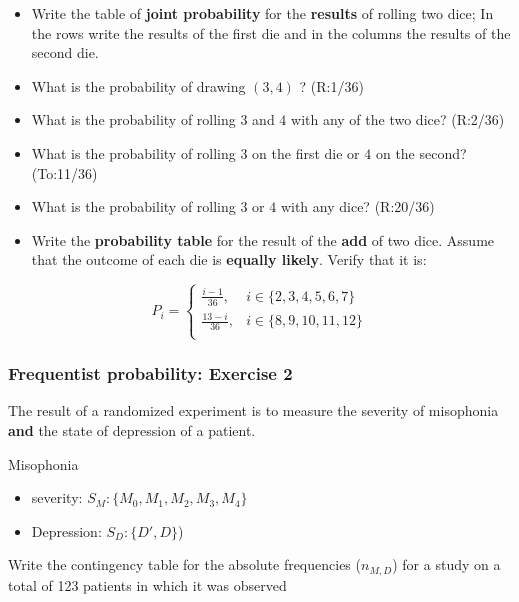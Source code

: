 \documentclass[
]{book}
\providecommand{\tightlist}{%
  \setlength{\itemsep}{0pt}\setlength{\parskip}{0pt}}
\begin{document}
\begin{itemize}
\item
  Write the table of \textbf{joint probability} for the \textbf{results} of rolling two dice; In the rows write the results of the first die and in the columns the results of the second die.
\item
  What is the probability of drawing \((3, 4)\) ? (R:1/36)
\item
  What is the probability of rolling \(3\) and \(4\) with any of the two dice? (R:2/36)
\item
  What is the probability of rolling \(3\) on the first die or \(4\) on the second? (To:11/36)
\item
  What is the probability of rolling \(3\) or \(4\) with any dice? (R:20/36)
\item
  Write the \textbf{probability table} for the result of the \textbf{add} of two dice. Assume that the outcome of each die is \textbf{equally likely}. Verify that it is:
\end{itemize}

\[
P_i=
\begin{cases}
\frac{i-1}{36},& i \in \{2,3,4,5,6, 7\} \\
\frac{13-i}{36},& i \in \{8,9,10,11,12\} \\
\end{cases}
\]

\hypertarget{frequentist-probability-exercise-2}{%
\subsubsection{Frequentist probability: Exercise 2}\label{frequentist-probability-exercise-2}}

The result of a randomized experiment is to measure the severity of misophonia \textbf{and} the state of depression of a patient.

Misophonia

\begin{itemize}
\tightlist
\item
  severity: \(S_M:\{M_ 0,M _1,M_2,M_3,M_4\}\)
\item
  Depression: \(S_ D:\{ D', D\}\))
\end{itemize}

Write the contingency table for the absolute frequencies (\(n_{ M,D }\)) for a study on a total of 123 patients in which it was observed
\end{document}
